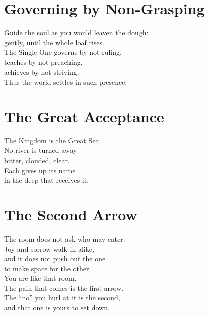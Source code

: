 \documentclass[10pt, openright]{book}
\newcommand{\sectionbreak}{\filbreak}
\newcommand{\sayingsource}[1]{\par\nopagebreak\vspace{0.3\baselineskip}{\raggedleft\footnotesize\itshape #1\par}}
\begin{document}
\sayingsource{Tao Te Ching 59 · Philip · Matthew 3:10}

\sectionbreak

\section{Governing by Non-Grasping}\label{governing-by-non-grasping}

Guide the soul as you would leaven the dough:\\
gently, until the whole loaf rises.\\
The Single One governs by not ruling,\\
teaches by not preaching,\\
achieves by not striving.\\
Thus the world settles in such presence.

\sayingsource{Tao Te Ching 60 · Thomas 96 · Matthew 13:33}

\sectionbreak

\section{The Great Acceptance}\label{the-great-acceptance}

The Kingdom is the Great Sea.\\
No river is turned away---\\
bitter, clouded, clear.\\
Each gives up its name\\
in the deep that receives it.

\sayingsource{Tao Te Ching 61}

\sectionbreak

\section{The Second Arrow}\label{the-second-arrow}

The room does not ask who may enter.\\
Joy and sorrow walk in alike,\\
and it does not push out the one\\
to make space for the other.\\
You are like that room.\\
The pain that comes is the first arrow.\\
The ``no'' you hurl at it is the second,\\
and that one is yours to set down.
\end{document}
